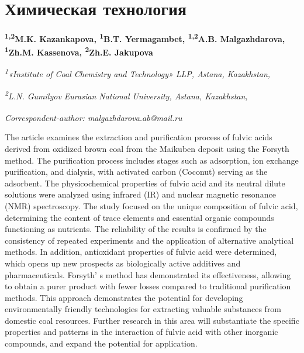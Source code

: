 \let\cleardoublepage\clearpage
\chapter{Химическая технология}

\begin{articleheader}

{\bfseries
\textsuperscript{1,2}M.K. Kazankapova\authorid,
\textsuperscript{1}B.T. Yermagambet\authorid,
\textsuperscript{1,2}A.B. Malgazhdarova\textsuperscript{\envelope }\authorid,
\textsuperscript{1}Zh.M. Kassenova\authorid,
\textsuperscript{2}Zh.E. Jakupova\authorid}
\end{articleheader}

\begin{affiliation}
\emph{\textsuperscript{1}«Institute of Coal Chemistry and Technology» LLP, Astana, Kazakhstan,}

\emph{\textsuperscript{2}L.N. Gumilyov Eurasian National University, Astana, Kazakhstan,}

\raggedright {\bfseries \textsuperscript{\envelope }}{\em Correspondent-author: malgazhdarova.ab@mail.ru}
\end{affiliation}

The article examines the extraction and purification process of fulvic
acids derived from oxidized brown coal from the Maikuben deposit using
the Forsyth method. The purification process includes stages such as
adsorption, ion exchange purification, and dialysis, with activated
carbon (Coconut) serving as the adsorbent. The physicochemical
properties of fulvic acid and its neutral dilute solutions were analyzed
using infrared (IR) and nuclear magnetic resonance (NMR) spectroscopy.
The study focused on the unique composition of fulvic acid, determining
the content of trace elements and essential organic compounds
functioning as nutrients. The reliability of the results is confirmed by
the consistency of repeated experiments and the application of
alternative analytical methods. In addition, antioxidant properties of
fulvic acid were determined, which opens up new prospects as
biologically active additives and pharmaceuticals.
Forsyth' s method has demonstrated its effectiveness,
allowing to obtain a purer product with fewer losses compared to
traditional purification methods. This approach demonstrates the
potential for developing environmentally friendly technologies for
extracting valuable substances from domestic coal resources. Further
research in this area will substantiate the specific properties and
patterns in the interaction of fulvic acid with other inorganic
compounds, and expand the potential for application.

